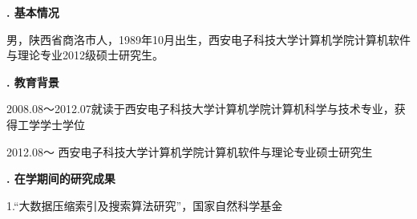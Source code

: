 \begin{authorintro}

{
    \bf\songti{}
    . 基本情况
}

男，陕西省商洛市人，1989年10月出生，西安电子科技大学计算机学院计算机软件与理论专业2012级硕士研究生。

{
    \bf\songti{}
    . 教育背景
}

2008.08～2012.07\quad\quad 就读于西安电子科技大学计算机学院计算机科学与技术专业，获得工学学士学位

2012.08～\hspace{2.2cm}       西安电子科技大学计算机学院计算机软件与理论专业硕士研究生



{
    \bf\songti{}
    . 在学期间的研究成果
}

\end{authorintro}
1.“大数据压缩索引及搜索算法研究”，国家自然科学基金

